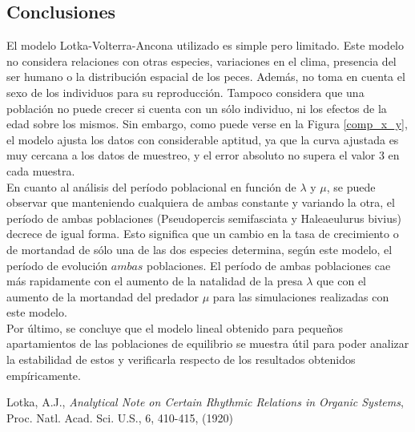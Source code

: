 \documentclass{article}
\numberwithin{equation}{section}
\begin{document}
\begin{multicols}{2}
\section{Conclusiones}
El modelo Lotka-Volterra-Ancona utilizado es simple pero limitado. Este modelo no considera relaciones con otras especies, variaciones en el clima, presencia del ser humano o la distribución espacial de los peces. Además, no toma en cuenta el sexo de los individuos para su reproducción. Tampoco considera que una población no puede crecer si cuenta con un sólo individuo, ni los efectos de la edad sobre los mismos. Sin embargo, como puede verse en la Figura \ref{comp_x_y}, el modelo ajusta los datos con considerable aptitud, ya que la curva ajustada es muy cercana a los datos de muestreo, y el error absoluto no supera el valor 3 en cada muestra.\\

En cuanto al análisis del período poblacional en función de $\lambda$ y $\mu$, se puede observar que manteniendo cualquiera de ambas constante y variando la otra, el período de ambas poblaciones (Pseudopercis semifasciata y Haleaeulurus bivius) decrece de igual forma. Esto significa que un cambio en la tasa de crecimiento o de mortandad de sólo una de las dos especies determina, según este modelo, el período de evolución $ambas$ poblaciones. El período de ambas poblaciones cae más rapidamente con el aumento de la natalidad de la presa $\lambda$ que con el aumento de la mortandad del predador $\mu$ para las simulaciones realizadas con este modelo. \\

Por último, se concluye que el modelo lineal obtenido para pequeños apartamientos de las poblaciones de equilibrio se muestra útil para poder analizar la estabilidad de estos y verificarla respecto de los resultados obtenidos empíricamente.


\begin{thebibliography}{9}
 Lotka, A.J., \emph{Analytical Note on Certain Rhythmic Relations in Organic Systems}, Proc. Natl. Acad. Sci. U.S., 6, 410-415, (1920)

\end{thebibliography}

\end{multicols}
\end{document}
